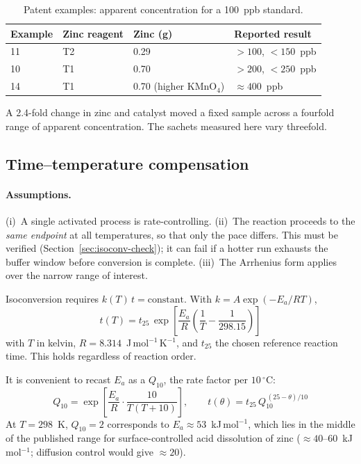 \documentclass[11pt,a4paper]{article}
\begin{document}
\begin{table}[h]
\centering
\caption{Patent examples: apparent concentration for a 100~ppb standard.}
\begin{tabular}{llll}
\toprule
Example & Zinc reagent & Zinc (g) & Reported result \\
\midrule
11 & T2 & 0.29 & $>100$, $<150$~ppb \\
10 & T1 & 0.70 & $>200$, $<250$~ppb \\
14 & T1 & 0.70 (higher KMnO$_4$) & $\approx 400$~ppb \\
\bottomrule
\end{tabular}
\end{table}

\noindent
A 2.4-fold change in zinc and catalyst moved a fixed sample across a
fourfold range of apparent concentration. The sachets measured here vary
threefold.

\subsection{Time--temperature compensation}

\paragraph{Assumptions.}
(i)~A single activated process is rate-controlling.
(ii)~The reaction proceeds to the \emph{same endpoint} at all temperatures,
so that only the pace differs. This must be verified
(Section~\ref{sec:isoconv-check}); it can fail if a hotter run exhausts the
buffer window before conversion is complete.
(iii)~The Arrhenius form applies over the narrow range of interest.

Isoconversion requires $k(T)\,t = \text{constant}$. With
$k = A\exp(-E_a/RT)$,
\begin{equation}
  \boxed{\;
  t(T) = t_{25}\,\exp\!\left[
    \frac{E_a}{R}\left(\frac{1}{T} - \frac{1}{298.15}\right)
  \right]\;}
  \label{eq:arrhenius}
\end{equation}
with $T$ in kelvin, $R = 8.314$~J\,mol$^{-1}$\,K$^{-1}$, and $t_{25}$ the
chosen reference reaction time. This holds regardless of reaction order.

It is convenient to recast $E_a$ as a $Q_{10}$, the rate factor per
$10\,^\circ$C:
\begin{equation}
  Q_{10} = \exp\!\left[\frac{E_a}{R}\cdot
  \frac{10}{T(T+10)}\right], \qquad
  t(\theta) = t_{25}\,Q_{10}^{\,(25-\theta)/10}
  \label{eq:q10}
\end{equation}
At $T = 298$~K, $Q_{10} = 2$ corresponds to
$E_a \approx 53$~kJ\,mol$^{-1}$, which lies in the middle of the published
range for surface-controlled acid dissolution of zinc
($\approx 40$--$60$~kJ\,mol$^{-1}$; diffusion control would give
$\approx 20$).
\end{document}
